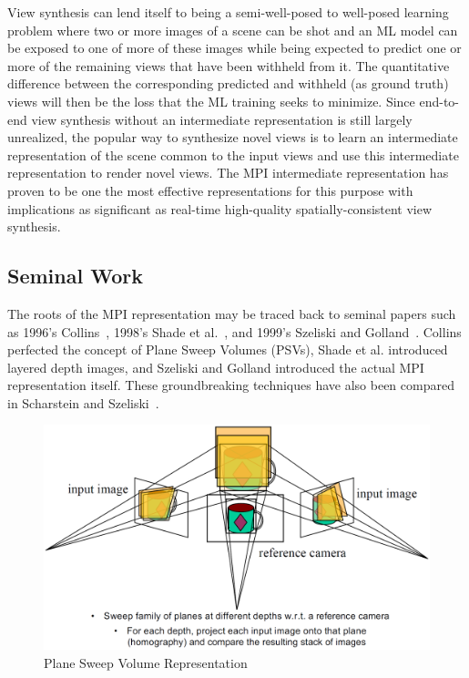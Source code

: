 View synthesis can lend itself to being a semi-well-posed to well-posed learning problem where two or more images of a scene can be shot and an ML model can be exposed to one of more of these images while being expected to predict one or more of the remaining views that have been withheld from it. The quantitative difference between the corresponding predicted and withheld (as ground truth) views will then be the loss that the ML training seeks to minimize. Since end-to-end view synthesis without an intermediate representation is still largely unrealized, the popular way to synthesize novel views is to learn an intermediate representation of the scene common to the input views and use this intermediate representation to render novel views. The MPI intermediate representation has proven to be one the most effective representations for this purpose with implications as significant as real-time high-quality spatially-consistent view synthesis.

\subsection{Seminal Work}\label{subsec:seminal-work}

The roots of the MPI representation may be traced back to seminal papers such as 1996's Collins~\cite{collins_space-sweep_1996}, 1998's Shade et al.~\cite{shade_layered_1998}, and 1999's Szeliski and Golland~\cite{szeliski_stereo_1999}. Collins perfected the concept of Plane Sweep Volumes (PSVs), Shade et al. introduced layered depth images, and Szeliski and Golland introduced the actual MPI representation itself. These groundbreaking techniques have also been compared in Scharstein and Szeliski~\cite{scharstein_taxonomy_2002}. 

\begin{figure}[!h]
    \includegraphics[width=1\columnwidth]{figures/plane-sweep-volume.png}
    \caption{Plane Sweep Volume Representation~\cite{svetlana_2019}}
    \label{fig:plane-sweep-volume}
\end{figure}

